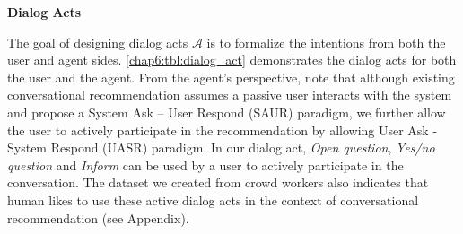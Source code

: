 \textbf{Dialog Acts}
\label{chap6:sec:dialog_act}

The goal of designing dialog acts $\mathcal{A}$ is to formalize the intentions from both the user and agent sides. 
\ref{chap6:tbl:dialog_act} demonstrates the dialog acts for both the user and the agent.
From the agent's perspective, 
note that although existing conversational recommendation\cite{sun2018conversational,li2018towards,zhang2018towards} assumes a passive user interacts with the system and propose a System Ask – User Respond (SAUR) paradigm, we further allow the user to actively participate in the recommendation by allowing User Ask - System Respond (UASR) paradigm. In our dialog act, \textit{Open question}, \textit{Yes/no question} and \textit{Inform} can be used by a user to actively participate in the conversation. The dataset we created from crowd workers also indicates that human likes to use these active dialog acts in the context of conversational recommendation (see Appendix).


